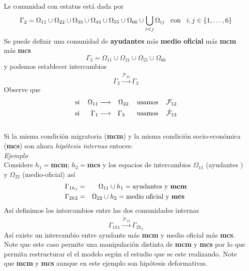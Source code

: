 \documentclass[]{article}
\begin{document}
Ls comunidad con estatus est\'a dada por 
\begin{equation}
\Gamma_2=\Omega_{11}\cup \Omega_{22} \cup \Omega_{33} \cup \Omega_{44} \cup \Omega_{55} \cup \Omega_{66}\cup \bigcup_{i<j} \Omega_{ij} \hspace{0.3cm}\text{con}\hspace{0.3cm} i,j \in \{1,\dots,6\}
\end{equation}
Se puede definir una comunidad de \textbf{ayudantes} m\'as \textbf{medio oficial} m\'as \textbf{mcm} m\'as \textbf{mcs}
\begin{equation}
\Gamma_3=\Omega_{11}\cup\Omega_{21}\cup\Omega_{55}\cup\Omega_{66}
\end{equation}
y podemos establecer intercambios 
\begin{equation*}
\Gamma_2\xrightarrow{\tilde{\mathcal{F}}_{23}}\Gamma_3
\end{equation*}
Observe 	que 
\begin{eqnarray*}
\text{si }\hspace{0.3cm}\Omega_{11}&\longrightarrow&\Omega_{22}\hspace{0.3cm} \text{ usamos } \hspace{0.3cm}\mathcal{F}_{12}\\
\text{si}\hspace{0.6cm}\Gamma_1&\longrightarrow&\Gamma_{3}\hspace{0.5cm} \text{ usamos }\hspace{0.3cm} \tilde{\mathcal{F}}_{13}
\end{eqnarray*}
\emph{\underline{}}\\
Si la misma condici\'on migratoria (\textbf{mcm}) y la misma condici\'on socio-econ\'omica (\textbf{mcs}) son ahora \emph{hip\'otesis internas} entoces:\\
\emph{Ejemplo}\\
Considere $h_1=$\textbf{mcm};  $h_2=$\textbf{mcs} y  los espacios de intercambios $\Omega_{11}$ (ayudantes ) y $\Omega_{22}$ (medio-oficial) as\'i
\begin{eqnarray}
	\Gamma_{1h_1}&=&\Omega_{11} \cup h_1 =\text{ayudantes y \textbf{mcm}} \\
	\Gamma_{2h2}&=&\Omega_{22} \cup h_2 =\text{medio  oficial y \textbf{mcs} }    
\end{eqnarray}  
As\'i definimos los intercambios entre las dos comunidades internas
\begin{equation}
 	\Gamma_{1h1}\xrightarrow{\tilde{\mathcal{F}}_{12}} \Gamma_{2 h_2}
\end{equation}
As\'i existe un intercambio entre ayudante m\'as \textbf{mcm} y medio oficial m\'as \textbf{mcs}. Note que este caso permite una manipulaci\'on distinta de \textbf{mcm} y \textbf{mcs} por lo que permita restructurar el el modelo seg\'un el estudio que se este realizando. Note que \textbf{mcm} y \textbf{mcs} aunque en este ejemplo son hip\'otesis deformativas. \\
 
\end{document}
